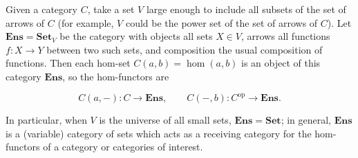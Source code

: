 Given a category $C$, take a set $V$ large enough to include all subsets of the set of arrows of $C$ (for example, $V$ could be the power set of the set of arrows of $C$). Let $\mathbf{Ens} = \mathbf{Set}_V$ be the category with objects all sets $X \in V$, arrows all functions $f: X \to Y$ between two such sets, and composition the usual composition of functions. Then each hom-set $C(a, b) = \hom(a, b)$ is an object of this category $\mathbf{Ens}$, so the hom-functors are

$$
C(a, -): C \to \mathbf{Ens}, \qquad C(-, b): C^{\text{op}} \to \mathbf{Ens}.
$$

In particular, when $V$ is the universe of all small sets, $\mathbf{Ens} = \mathbf{Set}$; in general, $\mathbf{Ens}$ is a (variable) category of sets which acts as a receiving category for the hom-functors of a category or categories of interest.

